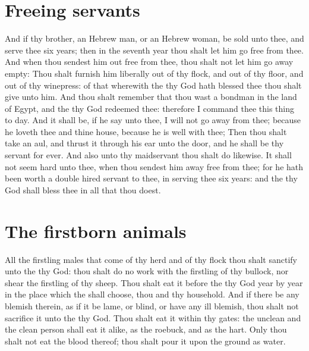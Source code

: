 \begin{biblechapter}
\section*{Freeing servants}
\verse And if thy brother, an Hebrew man, or an Hebrew woman, be sold unto thee, and serve thee six years; then in the seventh year thou shalt let him go free from thee.
\verse And when thou sendest him out free from thee, thou shalt not let him go away empty:
\verse Thou shalt furnish him liberally out of thy flock, and out of thy floor, and out of thy winepress: of that wherewith the \LORD thy God hath blessed thee thou shalt give unto him.
\verse And thou shalt remember that thou wast a bondman in the land of Egypt, and the \LORD thy God redeemed thee: therefore I command thee this thing to day.
\verse And it shall be, if he say unto thee, I will not go away from thee; because he loveth thee and thine house, because he is well with thee;
\verse Then thou shalt take an aul, and thrust it through his ear unto the door, and he shall be thy servant for ever. And also unto thy maidservant thou shalt do likewise.
\verse It shall not seem hard unto thee, when thou sendest him away free from thee; for he hath been worth a double hired servant to thee, in serving thee six years: and the \LORD thy God shall bless thee in all that thou doest.
\section*{The firstborn animals}
\verse All the firstling males that come of thy herd and of thy flock thou shalt sanctify unto the \LORD thy God: thou shalt do no work with the firstling of thy bullock, nor shear the firstling of thy sheep.
\verse Thou shalt eat it before the \LORD thy God year by year in the place which the \LORD shall choose, thou and thy household.
\verse And if there be any blemish therein, as if it be lame, or blind, or have any ill blemish, thou shalt not sacrifice it unto the \LORD thy God.
\verse Thou shalt eat it within thy gates: the unclean and the clean person shall eat it alike, as the roebuck, and as the hart.
\verse Only thou shalt not eat the blood thereof; thou shalt pour it upon the ground as water.
\end{biblechapter}

